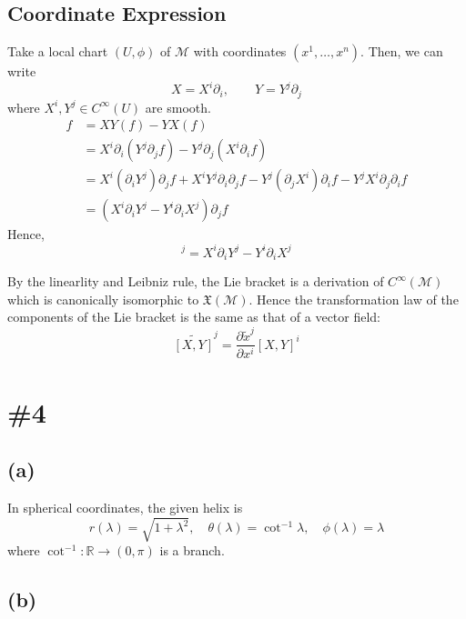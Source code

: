 \documentclass[a4paper,11pt]{article}
\begin{document}
\subsection{Coordinate Expression}
Take a local chart $(U, \phi)$ of $\mathcal{M}$ with coordinates $(x^1, \dots, x^n)$. Then, we can write
\begin{equation}
    X = X^i\partial_{i}, \qquad Y = Y^j\partial_{j}
\end{equation}
where $X^i, Y^j\in C^\infty(U)$ are smooth.
\begin{align}
    [X, Y]f &= XY(f) - YX(f) \\
    &= X^i\partial_{i}(Y^j\partial_{j}f) - Y^j\partial_{j}(X^i\partial_{i}f) \\
    &= X^i(\partial_{i}Y^j)\partial_{j}f + X^iY^j\partial_{i}\partial_{j}f - Y^j(\partial_{j}X^i)\partial_{i}f - Y^jX^i\partial_{j}\partial_{i}f \\
    &= (X^i\partial_{i}Y^j - Y^i\partial_{i}X^j)\partial_{j}f
\end{align}
Hence,
\begin{equation}
    [X, Y]^j = X^i\partial_{i}Y^j - Y^i\partial_{i}X^j
\end{equation}

By the linearlity and Leibniz rule, the Lie bracket is a derivation of $C^\infty(\mathcal{M})$ which is canonically isomorphic to $\mathfrak{X}(\mathcal{M})$. Hence the transformation law of the components of the Lie bracket is the same as that of a vector field:
\begin{equation}
    \widetilde{[X, Y]}^j = \frac{\partial \tilde{x}^j}{\partial x^i}[X, Y]^i
\end{equation}



\section{\#4}

\subsection{(a)}

In spherical coordinates, the given helix is
\begin{equation}
    r(\lambda)=\sqrt{1 + \lambda^2}, \quad \theta(\lambda)=\cot^{-1}\lambda, \quad \phi(\lambda)=\lambda
\end{equation}
where $\cot^{-1}:\mathbb{R}\to(0,\pi)$ is a branch.


\subsection{(b)}
\end{document}
